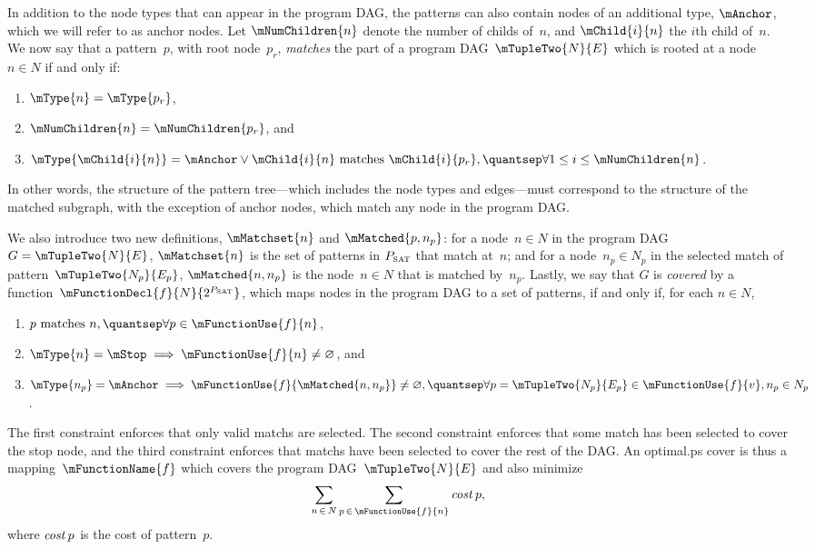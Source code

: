 In addition to the \gls{node} types that can appear in the \gls{program DAG},
the \glspl{pattern} can also contain \glspl{node} of an additional type,
$\mAnchor$, which we will refer to as \glspl{anchor node}.
%
Let
$\mNumChildren{n}$ denote the number of \glspl{child} of~$n$, and
$\mChild{i}{n}$ the $i$th child of~$n$.
%
We now say that a \gls{pattern}~$p$,
with \gls{root} \gls{node}~$p_r$, \emph{matches} the part of a \gls{program
  DAG}~\mbox{$\mTupleTwo{N}{E}$} which is rooted at a \gls{node}~\mbox{$n \in
  N$} if and only if:
\begin{enumerate}
  \item $\mType{n} = \mType{p_r}$,
  \item $\mNumChildren{n} = \mNumChildren{p_r}$, and
  \item $\mType{\mChild{i}{n}} = \mAnchor \mOr
    \text{$\mChild{i}{n}$ matches $\mChild{i}{p_r}$}, \quantsep
    \forall 1 \leq i \leq \mNumChildren{n}$.
\end{enumerate}
In other words, the structure of the \gls{pattern tree}---which includes the
\gls{node} types and \glspl{edge}---must correspond to the structure of the
matched \gls{subgraph}, with the exception of \glspl{anchor node}, which match
any \gls{node} in the \gls{program DAG}.

We also introduce two new definitions, $\mMatchset{n}$ and $\mMatched{p, n_p}$:
for a \gls{node}~\mbox{$n \in N$} in the \gls{program DAG}~\mbox{$G =
  \mTupleTwo{N}{E}$}, $\mMatchset{n}$ is the set of \glspl{pattern} in $\mPSat$
that match at~$n$; and for a \gls{node}~\mbox{$n_p \in N_p$} in the selected
\gls{match} of pattern~\mbox{$\mTupleTwo{N_p}{E_p}$}, \mbox{$\mMatched{n, n_p}$}
is the \gls{node}~\mbox{$n \in N$} that is matched by~$n_p$.
%
Lastly, we say that
$G$ is \emph{covered} by a function~\mbox{$\mFunctionDecl{f}{N}{2^{\mPSat}}$},
which maps \glspl{node} in the \gls{program DAG} to a set of \glspl{pattern}, if
and only if, for each \mbox{$n \in N$},
\begin{enumerate}
  \item $\text{$p$ matches $n$}, \quantsep \forall p \in \mFunctionUse{f}{n}$,
  \item $\mType{n} = \mStop \implies \mFunctionUse{f}{n} \neq \emptyset$, and
  \item $\mType{n_p} = \mAnchor \implies
    \mFunctionUse{f}{\mMatched{n, n_p}} \neq \emptyset, \quantsep
    \forall p = \mTupleTwo{N_p}{E_p} \in \mFunctionUse{f}{v}, n_p \in N_p$.
\end{enumerate}
The first constraint enforces that only valid \glspl{match} are selected.
%
The
second constraint enforces that some \gls{match} has been selected to cover the
\gls{stop node}, and the third constraint enforces that \glspl{match} have been
selected to cover the rest of the \gls{DAG}.
%
An \gls{optimal.ps} cover is
thus a mapping~$\mFunctionName{f}$ which covers the \gls{program
  DAG}~\mbox{$\mTupleTwo{N}{E}$} and also minimize
\begin{displaymath}
  \sum_{n \, \in \, N} \sum_{p \, \in \, \mFunctionUse{f}{n}} \mCost{p},
\end{displaymath}
where $\operatorname{\textrm{\textit{cost}}}{p}$ is the cost of \gls{pattern}~$p$.


